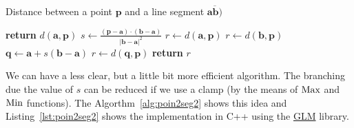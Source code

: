 {\centering
\begin{minipage}{\linewidth}
  \begin{algorithm}[H]
    \caption{Distance between a point $\mathbf{p}$ and a line segment $\overline{\mathbf{a}\mathbf{b})}$}
    \label{alg:poin2seg}
    \begin{algorithmic}[1] %
       
         
          \State \textbf{return} $d(\mathbf{a},\mathbf{p})$
        \EndIf
        \State $s \gets \frac{(\mathbf{p} - \mathbf{a}) \cdot (\mathbf{b} - \mathbf{a})}{|\mathbf{b} - \mathbf{a}|^2}$ 
         
          \State $r \gets d(\mathbf{a},\mathbf{p})$
          
          \State $r \gets d(\mathbf{b},\mathbf{p})$
        \Else {}
          \State $\mathbf{q} \gets \mathbf{a} + s (\mathbf{b} - \mathbf{a})$ 
          \State $r \gets d(\mathbf{q},\mathbf{p})$
        \EndIf
        \State \textbf{return} $r$ 
      \EndProcedure
    \end{algorithmic}
  \end{algorithm}
\end{minipage}
\par
}

We can have a less clear, but a little bit more efficient algorithm.
The branching due the value of $s$ can be reduced if we use a clamp (by the means of $\operatorname{Max}$ and $\operatorname{Min}$ functions).
The Algorthm~\ref{alg:poin2seg2} shows this idea and Listing~\ref{lst:poin2seg2} shows the implementation in C++ using the \href{https://glm.g-truc.net}{GLM} library.

